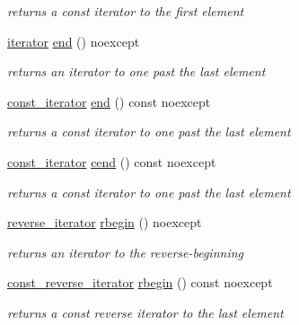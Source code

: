 \begin{DoxyCompactItemize}
\begin{DoxyCompactList}\small\item\em returns a const iterator to the first element \end{DoxyCompactList}\item 
\mbox{\hyperlink{classnlohmann_1_1basic__json_a099316232c76c034030a38faa6e34dca}{iterator}} \mbox{\hyperlink{classnlohmann_1_1basic__json_a13e032a02a7fd8a93fdddc2fcbc4763c}{end}} () noexcept
\begin{DoxyCompactList}\small\item\em returns an iterator to one past the last element \end{DoxyCompactList}\item 
\mbox{\hyperlink{classnlohmann_1_1basic__json_a41a70cf9993951836d129bb1c2b3126a}{const\+\_\+iterator}} \mbox{\hyperlink{classnlohmann_1_1basic__json_a1c15707055088cd5436ae91db72cbe67}{end}} () const noexcept
\begin{DoxyCompactList}\small\item\em returns a const iterator to one past the last element \end{DoxyCompactList}\item 
\mbox{\hyperlink{classnlohmann_1_1basic__json_a41a70cf9993951836d129bb1c2b3126a}{const\+\_\+iterator}} \mbox{\hyperlink{classnlohmann_1_1basic__json_a8dba7b7d2f38e6b0c614030aa43983f6}{cend}} () const noexcept
\begin{DoxyCompactList}\small\item\em returns a const iterator to one past the last element \end{DoxyCompactList}\item 
\mbox{\hyperlink{classnlohmann_1_1basic__json_ac223d5560c2b05a208c88de67376c5f2}{reverse\+\_\+iterator}} \mbox{\hyperlink{classnlohmann_1_1basic__json_a1ef93e2006dbe52667294f5ef38b0b10}{rbegin}} () noexcept
\begin{DoxyCompactList}\small\item\em returns an iterator to the reverse-\/beginning \end{DoxyCompactList}\item 
\mbox{\hyperlink{classnlohmann_1_1basic__json_a72be3c24bfa24f0993d6c11af03e7404}{const\+\_\+reverse\+\_\+iterator}} \mbox{\hyperlink{classnlohmann_1_1basic__json_a515e7618392317dbf4b72d3e18bf2ab2}{rbegin}} () const noexcept
\begin{DoxyCompactList}\small\item\em returns a const reverse iterator to the last element \end{DoxyCompactList}\item 

\end{DoxyCompactItemize}
